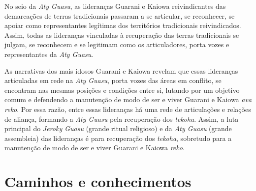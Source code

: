 No seio da \emph{Aty Guasu}, as lideranças Guarani e Kaiowa reivindicantes das
demarcações de terras tradicionais passaram a se articular, se
reconhecer, se apoiar como representantes legítimas dos territórios
tradicionais reivindicados. Assim, todas as lideranças vinculadas à
recuperação das terras tradicionais se julgam, se reconhecem e se
legitimam como os articuladores, porta vozes e representantes da \emph{Aty
Guasu}. 

As narrativas dos mais idosos Guarani e Kaiowa revelam que essas
lideranças articuladas em rede na \emph{Aty Guasu}, porta vozes das áreas em
conflito, se encontram nas mesmas posições e condições entre si,
lutando por um objetivo comum e defendendo a manutenção de modo de ser
e viver Guarani e Kaiowa \emph{ava reko}. Por essa razão, entre essas
lideranças há uma rede de articulações e relações de aliança, formando
a \emph{Aty Guasu} pela recuperação dos \emph{tekoha}. Assim, a luta principal do
\emph{Jeroky Guasu} (grande ritual religioso) e da \emph{Aty Guasu} (grande
assembleia) das lideranças é para recuperação dos \emph{tekoha}, sobretudo
para a manutenção de modo de ser e viver Guarani e Kaiowa \emph{reko}.

\makeatletter\@openrightfalse
\movetooddpage
\part{Caminhos e conhecimentos}

